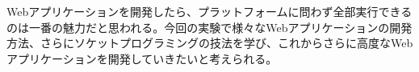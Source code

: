 Webアプリケーションを開発したら、プラットフォームに問わず全部実行できるのは一番の魅力だと思われる。今回の実験で様々なWebアプリケーションの開発方法、さらにソケットプログラミングの技法を学び、これからさらに高度なWebアプリケーションを開発していきたいと考えられる。